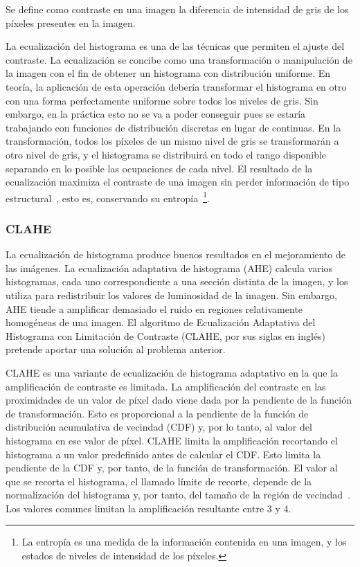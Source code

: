 \begin{definition}
	Se define como contraste en una imagen la diferencia de intensidad de gris de los píxeles presentes en la imagen.
\end{definition}

La ecualización del histograma es una de las técnicas que permiten el ajuste del contraste. La ecualización se concibe como una transformación o manipulación de la imagen con el fin de obtener un histograma con distribución uniforme. En teoría, la aplicación de esta operación debería transformar el histograma en otro con una forma perfectamente uniforme sobre todos los niveles de gris. Sin embargo, en la práctica esto no se va a poder conseguir pues se estaría trabajando con funciones de distribución discretas en lugar de continuas. En la transformación, todos los píxeles de un mismo nivel de gris se transformarán a otro nivel de gris, y el histograma se distribuirá en todo el rango disponible separando en lo posible las ocupaciones de cada nivel. El resultado de la ecualización maximiza el contraste de una imagen sin perder información de tipo estructural~\cite{solomon2011fundamentals}, esto es, conservando su entropía~\footnote{La entropía es una medida de la información contenida en una imagen, y los estados de niveles de intensidad de los píxeles.}.

\subsubsection{CLAHE}

La ecualización de histograma produce buenos resultados en el mejoramiento de las imágenes. La ecualización adaptativa de histograma (AHE) calcula varios histogramas, cada uno correspondiente a una sección distinta de la imagen, y los utiliza para redistribuir los valores de luminosidad de la imagen.  Sin embargo, AHE tiende a amplificar demasiado el ruido en regiones relativamente homogéneas de una imagen. El algoritmo de Ecualización Adaptativa del Histograma con Limitación de Contraste (CLAHE, por sus siglas en inglés) pretende aportar una solución al problema anterior. 

CLAHE es una variante de ecualización de histograma adaptativo en la que la amplificación de contraste es limitada. La amplificación del contraste en las proximidades de un valor de píxel dado viene dada por la pendiente de la función de transformación. Esto es proporcional a la pendiente de la función de distribución acumulativa de vecindad (CDF) y, por lo tanto, al valor del histograma en ese valor de píxel.  CLAHE limita la amplificación recortando el histograma a un valor predefinido antes de calcular el CDF. Esto limita la pendiente de la CDF y, por tanto, de la función de transformación. El valor al que se recorta el histograma, el llamado límite de recorte, depende de la normalización del histograma y, por tanto, del tamaño de la región de vecindad~\cite{pizer1987adaptive}. Los valores comunes limitan la amplificación resultante entre 3 y 4.
 
